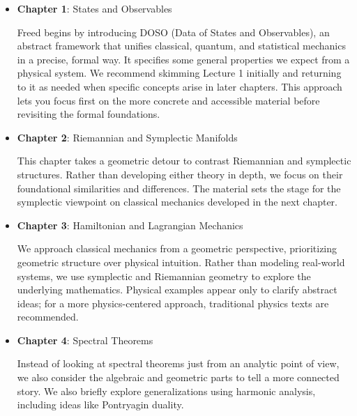\begin{itemize}
    \item \textbf{Chapter 1}: States and Observables

    Freed begins by introducing DOSO (Data of States and Observables), an abstract framework that unifies classical, quantum, and statistical mechanics in a precise, formal way. It specifies some general properties we expect from a physical system. We recommend skimming Lecture 1 initially and returning to it as needed when specific concepts arise in later chapters. This approach lets you focus first on the more concrete and accessible material before revisiting the formal foundations.

    \item \textbf{Chapter 2}: Riemannian and Symplectic Manifolds
    
    This chapter takes a geometric detour to contrast Riemannian and symplectic structures. Rather than developing either theory in depth, we focus on their foundational similarities and differences. The material sets the stage for the symplectic viewpoint on classical mechanics developed in the next chapter.
    
    \item \textbf{Chapter 3}: Hamiltonian and Lagrangian Mechanics
    
    We approach classical mechanics from a geometric perspective, prioritizing geometric structure over physical intuition. Rather than modeling real-world systems, we use symplectic and Riemannian geometry to explore the underlying mathematics. Physical examples appear only to clarify abstract ideas; for a more physics-centered approach, traditional physics texts are recommended.

    \item \textbf{Chapter 4}: Spectral Theorems

    Instead of looking at spectral theorems just from an analytic point of view, we also consider the algebraic and geometric parts to tell a more connected story. We also briefly explore generalizations using harmonic analysis, including ideas like Pontryagin duality.
    
\end{itemize}


